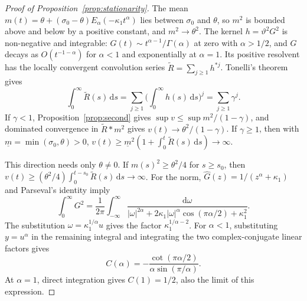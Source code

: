 \documentclass{rQUF2e}
\theoremstyle{plain}
\theoremstyle{definition}
\theoremstyle{remark}
\newcommand{\D}{\mathrm{d}}
\begin{document}
\begin{proof}[Proof of Proposition~\ref{prop:stationarity}] The mean $m(t)=\theta+(\sigma_0-\theta)E_\alpha(-\kappa_1t^\alpha)$ lies between $\sigma_0$ and $\theta$, so $m^2$ is bounded above and below by a positive constant, and $m^2\to\theta^2$. The kernel $h=\vartheta^2G^2$ is non-negative and integrable: $G(t)\sim t^{\alpha-1}/\Gamma(\alpha)$ at zero with $\alpha>1/2$, and $G$ decays as $O(t^{-1-\alpha})$ for $\alpha<1$ and exponentially at $\alpha=1$. Its positive resolvent has the locally convergent convolution series $\widetilde R=\sum_{j\ge1}h^{*j}$. Tonelli's theorem gives
\begin{equation*}
\int_0^\infty\widetilde R(s)\,\D s
=\sum_{j\ge1}\Big(\int_0^\infty h(s)\,\D s\Big)^j
=\sum_{j\ge1}\gamma^j.
\end{equation*}
If $\gamma<1$, Proposition~\ref{prop:second} gives $\sup v\le\sup m^2/(1-\gamma)$, and dominated convergence in $\widetilde R*m^2$ gives $v(t)\to\theta^2/(1-\gamma)$. If $\gamma\ge1$, then with $\underline m=\min(\sigma_0,\theta)>0$,
$v(t)\ge\underline m^2(1+\int_0^t\widetilde R(s)\,\D s)\to\infty$.

This direction needs only $\theta\ne0$. If $m(s)^2\ge\theta^2/4$ for $s\ge s_0$, then $v(t)\ge(\theta^2/4)\int_0^{t-s_0}\widetilde R(s)\,\D s\to\infty$.
For the norm, $\widehat G(z)=1/(z^\alpha+\kappa_1)$ and Parseval's identity imply
\begin{equation*}
\int_0^\infty G^2=\frac1{2\pi}\int_{-\infty}^\infty
\frac{\D\omega}{|\omega|^{2\alpha}+2\kappa_1|\omega|^\alpha\cos(\pi\alpha/2)+\kappa_1^2}.
\end{equation*}
The substitution $\omega=\kappa_1^{1/\alpha}u$ gives the factor $\kappa_1^{1/\alpha-2}$. For $\alpha<1$, substituting $y=u^\alpha$ in the remaining integral and integrating the two complex-conjugate linear factors gives
\begin{equation*}
C(\alpha)=-\frac{\cot(\pi\alpha/2)}{\alpha\sin(\pi/\alpha)}.
\end{equation*}
At $\alpha=1$, direct integration gives $C(1)=1/2$, also the limit of this expression. \end{proof}
\end{document}
